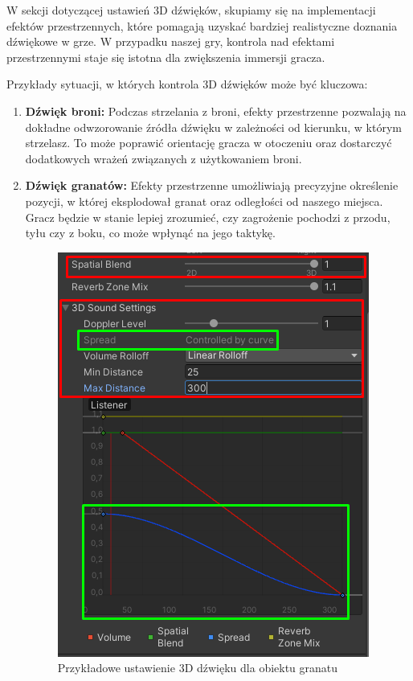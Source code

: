 W sekcji dotyczącej ustawień 3D dźwięków, skupiamy się na implementacji efektów przestrzennych, które pomagają uzyskać bardziej realistyczne doznania dźwiękowe w grze. W przypadku naszej gry, kontrola nad efektami przestrzennymi staje się istotna dla zwiększenia immersji gracza.

Przykłady sytuacji, w których kontrola 3D dźwięków może być kluczowa:

\begin{enumerate}
    \item \textbf{Dźwięk broni:} Podczas strzelania z broni, efekty przestrzenne pozwalają na dokładne odwzorowanie źródła dźwięku w zależności od kierunku, w którym strzelasz. To może poprawić orientację gracza w otoczeniu oraz dostarczyć dodatkowych wrażeń związanych z użytkowaniem broni.
    \item \textbf{Dźwięk granatów:} Efekty przestrzenne umożliwiają precyzyjne określenie pozycji, w której eksplodował granat oraz odległości od naszego miejsca. Gracz będzie w stanie lepiej zrozumieć, czy zagrożenie pochodzi z przodu, tyłu czy z boku, co może wpłynąć na jego taktykę.
    \begin{figure}[h]
            \centering
            \includegraphics[scale=0.5]{Images/grenade3DSet.png}
            \caption{Przykładowe ustawienie 3D dźwięku dla obiektu granatu}
        \end{figure}

\end{enumerate}

